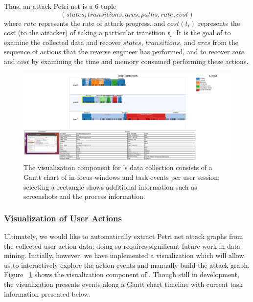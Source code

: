 Thus, an attack Petri net is a 6-tuple~\cite{Wang2013} 
\[
  (\mathit{states},
  \mathit{transitions},
  \mathit{arcs},
  \mathit{paths},
  \mathit{rate},
  \mathit{cost}
  )
\]
where $\mathit{rate}$ represents the rate of attack progress, and $\mathit{cost}(t_i)$ represents the cost (to the attacker) of taking a particular transition $t_i$. It is the goal of \revenge to examine the collected data and recover $\mathit{states}$, $\mathit{transitions}$, and
$\mathit{arcs}$ from the sequence of actions that the reverse engineer has performed, and to recover $\mathit{rate}$ and $\mathit{cost}$
by examining the time and memory consumed performing these actions.

\begin{figure}[t]
\includegraphics[width=\columnwidth]{screenshot.PNG}
\caption{The visualization component for \revenge's data collection consists of a Gantt chart of in-focus windows and task events per user session; selecting a rectangle shows additional information such as screenshots and the process information.}
\label{fig:screenshot}
\end{figure}

\subsubsection{Visualization of User Actions}
Ultimately, we would like to automatically extract Petri net attack graphs from the collected user action data; doing so requires significant future work in data mining. Initially, however, we have implemented a visualization which will allow us to interactively explore the action events and manually build the attack graph. Figure ~\ref{fig:screenshot} shows the visualization component of \revenge.
Though still in development, the visualization presents events along a Gantt chart timeline with current task information presented below.



